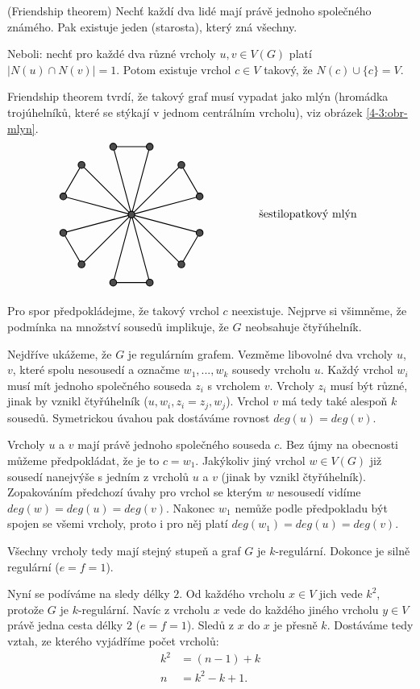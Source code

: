 \vt(Friendship theorem) Nechť každí dva lidé mají právě jednoho společného známého. Pak existuje jeden (starosta), který zná všechny.

Neboli: nechť pro každé dva různé vrcholy $u, v \in V(G)$ platí $|N(u) \cap N(v)| = 1$. Potom existuje vrchol $c \in V$ takový, že $N(c) \cup \{c\} = V$.

\pzn Friendship theorem tvrdí, že takový graf musí vypadat jako
mlýn (hromádka trojúhelníků, které se stýkají v jednom centrálním vrcholu), viz obrázek \ref{4-3:obr-mlyn}.
\begin{align}
\label{4-3:obr-mlyn}
\begin{tikzpicture}[thick,scale=1.1]
\draw \foreach \x in {15,75,...,315}
    {
        (0,0) -- (\x:2) \vrchol -- (\x+30:2) \vrchol -- cycle
    };
\draw (0,0) \vrchol;
\draw (5,0) node {šestilopatkový mlýn};
\end{tikzpicture}
\end{align}

\dk
Pro spor předpokládejme, že takový vrchol $c$ neexistuje. Nejprve si všimněme, že podmínka na množství sousedů implikuje, že $G$ neobsahuje čtyřúhelník. 

Nejdříve ukážeme, že $G$ je regulárním grafem. Vezměme libovolné dva vrcholy $u$, $v$, které spolu nesousedí a označme $w_1, ..., w_k$ sousedy vrcholu $u$. Každý vrchol $w_i$ musí mít jednoho společného souseda $z_i$ s vrcholem $v$. Vrcholy $z_i$ musí být různé, jinak by vznikl čtyřúhelník ($u, w_i,z_i =z_j, w_j$). Vrchol $v$ má tedy také alespoň $k$ sousedů. Symetrickou úvahou pak dostáváme rovnost $deg(u) = deg(v)$. 

Vrcholy $u$ a $v$ mají právě jednoho společného souseda $c$.
Bez újmy na obecnosti můžeme předpokládat, že je to $c=w_1$. Jakýkoliv jiný vrchol $w \in V(G)$ již sousedí nanejvýše s jedním z vrcholů $u$ a $v$ (jinak by vznikl čtyřúhelník). Zopakováním předchozí úvahy pro vrchol se kterým $w$ nesousedí vidíme $deg(w) = deg(u) = deg(v)$. Nakonec $w_1$ nemůže podle předpokladu být spojen se všemi vrcholy, proto i pro něj platí $deg(w_1) = deg(u) = deg(v)$.

Všechny vrcholy tedy mají stejný stupeň a graf $G$ je $k$-regulární. Dokonce je silně regulární ($e=f=1$).

Nyní se podíváme na sledy délky $2$. Od každého vrcholu $x \in V$ jich vede $k^2$, protože $G$ je $k$-regulární. Navíc z vrcholu $x$ vede do každého jiného vrcholu $y \in V$ právě jedna cesta délky $2$ ($e=f=1$). Sledů z $x$ do $x$ je přesně $k$. Dostáváme tedy vztah, ze kterého vyjádříme počet vrcholů:
\begin{align}
k^2 &= (n-1) + k \\
n &= k^2 -k +1. \label{4-3:friendship-vrcholy}
\end{align}

